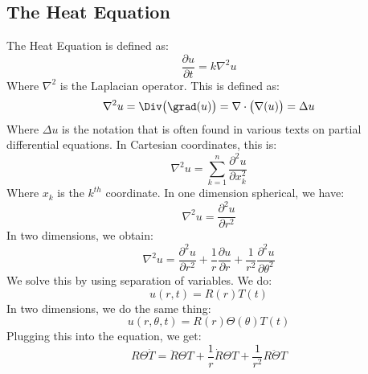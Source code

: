 \documentclass[crop=false,class=book,oneside]{standalone}
\begin{document}
        \subsection{The Heat Equation}
            The Heat Equation is defined as:
            \begin{equation}
                \frac{\partial{u}}{\partial{t}}=
                k\nabla^{2}u
            \end{equation}
            Where $\nabla^{2}$ is the Laplacian operator. This
            is defined as:
            \begin{equation}
                \nabla^{2}u=\Div\big(\grad(u)\big)
                =\nabla\cdot\big(\nabla(u)\big)=\Delta{u}
            \end{equation}
            Where $\Delta{u}$ is the notation that is often
            found in various texts on partial differential
            equations. In Cartesian coordinates, this is:
            \begin{equation}
                \nabla^{2}u=\sum_{k=1}^{n}
                    \frac{\partial^{2}u}{\partial{x}_{k}^{2}}
            \end{equation}
            Where $x_{k}$ is the $k^{th}$ coordinate. In
            one dimension spherical, we have:
            \begin{equation}
                \nabla^{2}u=\frac{\partial^{2}u}{\partial{r}^{2}}
            \end{equation}
            In two dimensions, we obtain:
            \begin{equation}
                \nabla^{2}u=\frac{\partial^{2}u}{\partial{r}^{2}}+
                    \frac{1}{r}\frac{\partial{u}}{\partial{r}}+
                    \frac{1}{r^{2}}
                    \frac{\partial^{2}u}{\partial\theta^{2}}
            \end{equation}
            We solve this by using separation of variables.
            We do:
            \begin{equation}
                u(r,t)=R(r)T(t)
            \end{equation}
            In two dimensions, we do the same thing:
            \begin{equation}
                u(r,\theta,t)=R(r)\Theta(\theta)T(t)
            \end{equation}
            Plugging this into the equation, we get:
            \begin{equation}
                R\Theta\dot{T}=
                \ddot{R}\Theta{T}+\frac{1}{r}\dot{R}\Theta{T}+
                \frac{1}{r^{2}}R\ddot{\Theta}T
            \end{equation}
\end{document}
